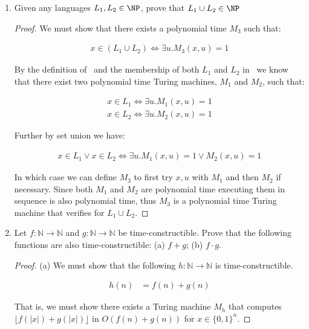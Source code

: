\documentclass[usletter]{article}
\begin{document}
\begin{enumerate}
  \item Given any languages $L_1, L_2 \in \NP$, prove that $L_1 \cup L_2 \in \NP$
    \begin{proof}
      We must show that there exists a polynomial time $M_3$ such that:

      \begin{align}
        x \in (L_1 \cup L_2) \iff \exists u.M_3(x,u) = 1
      \end{align}

      By the definition of \NP\ and the membership of both $L_1$ and $L_2$ in \NP\  we know that there exist two polynomial time Turing machines, $M_1$ and $M_2$, such that:

      \begin{align}
        x \in L_1 \iff \exists u.M_1(x,u) = 1 \\
        x \in L_2 \iff \exists u.M_2(x,u) = 1
      \end{align}

      Further by set union we have:

      \begin{align}
        x \in L_1 \lor x \in L_2 \iff \exists u.M_1(x,u) = 1 \lor  M_2(x,u) = 1
      \end{align}

      In which case we can define $M_3$ to first try $x,u$ with $M_1$ and then $M_2$ if necessary. Since both $M_1$ and $M_2$ are polynomial time executing them in sequence is also polynomial time, thus $M_3$ is a polynomial time Turing machine that verifies for $L_1 \cup L_2$.
    \end{proof}

  \item Let $f : \mathbb{N} \rightarrow \mathbb{N}$ and $g : \mathbb{N} \rightarrow \mathbb{N}$ be time-constructible. Prove that the following functions are also time-constructible: (a) $f + g$; (b) $f \cdot g$.


    \begin{proof} (a)
      We must show that the following $h : \mathbb{N} \rightarrow \mathbb{N}$ is time-constructible.

      \begin{align*}
        h(n) &= f(n) + g(n)
      \end{align*}

      That is, we must show there exists a Turing machine $M_h$ that computes $\lfloor f(|x|) + g(|x|) \rfloor$ in $O(f(n) + g(n))$ for $x \in \{0,1\}^n$.


\end{proof}
\end{enumerate}
\end{document}

